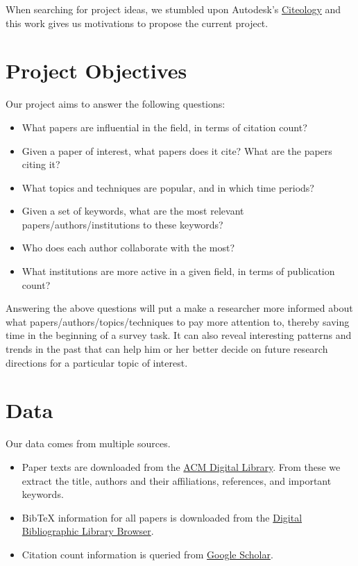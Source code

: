 \documentclass[12pt]{article}
\begin{document}
When searching for project ideas, we stumbled upon Autodesk's \href{http://www.autodeskresearch.com/projects/citeology}{Citeology} and this work gives us motivations to propose the current project.

\section{Project Objectives}
Our project aims to answer the following questions:
\begin{itemize}
    \item What papers are influential in the field, in terms of citation count?
    \item Given a paper of interest, what papers does it cite? What are the papers citing it?
    \item What topics and techniques are popular, and in which time periods?
    \item Given a set of keywords, what are the most relevant papers/authors/institutions to these keywords?
    \item Who does each author collaborate with the most?
    \item What institutions are more active in a given field, in terms of publication count?    
\end{itemize}
Answering the above questions will put a make a researcher more informed about what papers/authors/topics/techniques to pay more attention to, thereby saving time in the beginning of a survey task. It can also reveal interesting patterns and trends in the past that can help him or her better decide on future research directions for a particular topic of interest.

\section{Data}
Our data comes from multiple sources.
\begin{itemize}
    \item Paper texts are downloaded from the \href{http://dl.acm.org/}{ACM Digital Library}. From these we extract the title, authors and their affiliations, references, and important keywords.
    \item BibTeX information for all papers is downloaded from  the \href{http://dblp.uni-trier.de/db/}{Digital Bibliographic Library Browser}.
    \item Citation count information is queried from \href{https://scholar.google.com/}{Google Scholar}.
\end{itemize}
\end{document}
